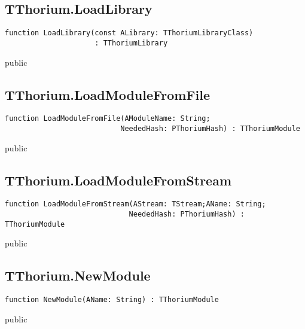 \subsection{TThorium.LoadLibrary}
\label{thoriumcore:thorium:tthorium:loadlibrary}
\begin{FPCList}
\Synopsis
\Declaration 

\begin{verbatim}
function LoadLibrary(const ALibrary: TThoriumLibraryClass)
                     : TThoriumLibrary
\end{verbatim}
\Visibility
public
\Description
\Errors
\end{FPCList}
\subsection{TThorium.LoadModuleFromFile}
\label{thoriumcore:thorium:tthorium:loadmodulefromfile}
\begin{FPCList}
\Synopsis
\Declaration 

\begin{verbatim}
function LoadModuleFromFile(AModuleName: String;
                           NeededHash: PThoriumHash) : TThoriumModule
\end{verbatim}
\Visibility
public
\Description
\Errors
\end{FPCList}
\subsection{TThorium.LoadModuleFromStream}
\label{thoriumcore:thorium:tthorium:loadmodulefromstream}
\begin{FPCList}
\Synopsis
\Declaration 

\begin{verbatim}
function LoadModuleFromStream(AStream: TStream;AName: String;
                             NeededHash: PThoriumHash) : TThoriumModule
\end{verbatim}
\Visibility
public
\Description
\Errors
\end{FPCList}
\subsection{TThorium.NewModule}
\label{thoriumcore:thorium:tthorium:newmodule}
\begin{FPCList}
\Synopsis
\Declaration 

\begin{verbatim}
function NewModule(AName: String) : TThoriumModule
\end{verbatim}
\Visibility
public
\Description
\Errors
\end{FPCList}
